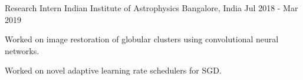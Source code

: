 

\begin{cventries}

  \cventry
    {Research Intern} %
    {Indian Institute of Astrophysics} %
    {Bangalore, India} %
    {Jul 2018 - Mar 2019} %
    {
      \begin{cvitems} %
        \item {Worked on image restoration of globular clusters using convolutional neural networks.}
        \item {Worked on novel adaptive learning rate schedulers for SGD.}
      \end{cvitems}
    }

\end{cventries}
